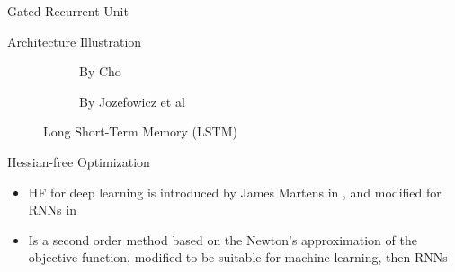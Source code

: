 \documentclass[12pt]{beamer}
\begin{document}
\begin{frame}{Gated Recurrent Unit}
    \begin{alertblock}{Architecture Illustration}
        \begin{figure}[t!]
            \centering
            \setlength{\fboxsep}{1pt}%
            \setlength{\fboxrule}{0.5pt}%
            \begin{subfigure}[t]{0.5\textwidth}
                \centering
                \caption{By Cho \cite{cho14GRU}}
            \end{subfigure}%
            \begin{subfigure}[t]{0.5\textwidth}
                \centering
                \caption{By Jozefowicz et al \cite{conf/icml/JozefowiczZS15}}
            \end{subfigure}
            \label{fig:sub1}
            \caption{Long Short-Term Memory (LSTM)}
        \end{figure}
    \end{alertblock}
\end{frame}

\begin{frame}{Hessian-free Optimization}
    \begin{alertblock}{}
        \begin{itemize}
            \item HF for deep learning is introduced by James Martens in \cite{martens2010HFDNN}, and modified for RNNs in \cite{Martens2011HFRNN}
            \item Is a second order method based on the Newton's approximation of the objective function, modified to be suitable for machine learning, then RNNs
        \end{itemize}
    \end{alertblock}
\end{frame}
\end{document}
